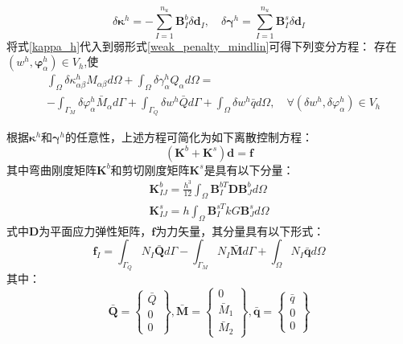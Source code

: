\begin{equation}\label{kappa_h}
    \delta\boldsymbol\kappa^h = - \sum_{I=1}^{n_u} \boldsymbol B^b_I \delta\boldsymbol d_I ,\quad \delta\boldsymbol\gamma^h = \sum_{I=1}^{n_u} \boldsymbol B^s_I \delta\boldsymbol d_I
\end{equation}
将式\eqref{kappa_h}代入到弱形式\eqref{weak_penalty_mindlin}可得下列变分方程：
存在$(w^h,\boldsymbol{\varphi}^h_{\alpha})\in V_h$,使
\begin{equation}\label{ritz_penalty_mindlin}
    \begin{split} 
        &\int_{\Omega}\delta\kappa^h_{\alpha\beta}M_{\alpha\beta}d\Omega+\int_{\Omega}\delta\gamma^h_{\alpha}Q_{\alpha}d\Omega=\\
        &-\int_{\Gamma_{M}}\delta\varphi^h_{\alpha}{\bar{M}_{\alpha}}d\Gamma+\int_{\Gamma_{Q}}{\delta{w^h}}\bar {Q}d\Gamma+\int_{\Omega} \delta{w^h}\bar{q}d\Omega,\quad \forall(\delta w^h,\delta\varphi^h_{\alpha}) \in V_h
    \end{split}
\end{equation}

根据$\pmb\kappa^h$和$\pmb\gamma^h$的任意性，上述方程可简化为如下离散控制方程：
\begin{equation}
    (\boldsymbol K^b + \boldsymbol K^s) \boldsymbol d = \boldsymbol f
\end{equation}
其中弯曲刚度矩阵$\boldsymbol K^b$和剪切刚度矩阵$\boldsymbol K^s$是具有以下分量：
\begin{subequations}\label{stiffness_mindlin}
    \begin{alignat}{2}
    \label{stiffness_bending}
    \boldsymbol K^b_{IJ} = \frac{h^3}{12} \int_\Omega \boldsymbol B^{bT}_I \boldsymbol D \boldsymbol B^b_J d\Omega\\
    \label{stiffness_shear}
    \boldsymbol K^s_{IJ} = h \int_\Omega \boldsymbol B^{sT}_I kG \boldsymbol B^s_J d\Omega
    \end{alignat}
\end{subequations}
式中$\pmb{D}$为平面应力弹性矩阵，$\pmb{f}$为力矢量，其分量具有以下形式：
\begin{equation}
    \boldsymbol f_I = \int_{\Gamma_Q} N_I \bar{\boldsymbol Q} d\Gamma - \int_{\Gamma_M} N_I \bar{\boldsymbol M} d\Gamma + \int_\Omega N_I \bar{\boldsymbol q} d\Omega
\end{equation}
其中：
\begin{equation}
    \bar{\boldsymbol Q} =  
    \begin{Bmatrix}
        \bar Q \\ 0 \\ 0
    \end{Bmatrix},
        \bar{\boldsymbol M} =
    \begin{Bmatrix}
        0 \\ \bar M_1 \\ \bar M_2
    \end{Bmatrix},
        \bar{\boldsymbol q} =
    \begin{Bmatrix}
        \bar q \\ 0 \\ 0
    \end{Bmatrix}
\end{equation}

